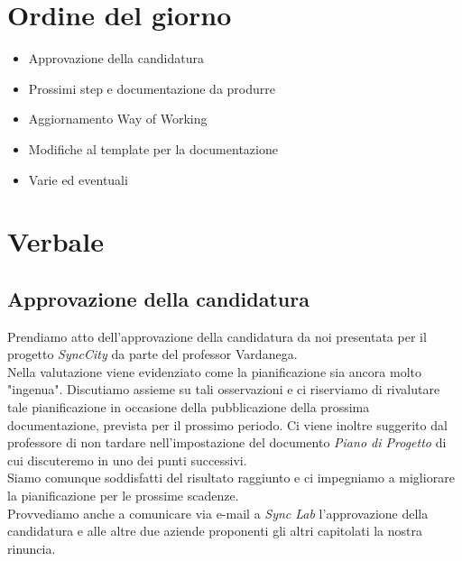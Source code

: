 \documentclass[italian,12pt]{article} %
\begin{document}
\section{Ordine del giorno}
\begin{itemize}
	\itemsep0em
	\item \textbf{}Approvazione della candidatura
	\item \textbf{}Prossimi step e documentazione da produrre
	\item \textbf{}Aggiornamento Way of Working
	\item \textbf{}Modifiche al template per la documentazione
	\item \textbf{}Varie ed eventuali
\end{itemize}

\newpage

\section{Verbale}

\subsection{Approvazione della candidatura}
Prendiamo atto dell'approvazione della candidatura da noi presentata per il progetto 
\textit{SyncCity} da parte del professor Vardanega. \\
Nella valutazione viene evidenziato come la pianificazione sia ancora molto "ingenua". 
Discutiamo assieme su tali osservazioni e ci riserviamo di rivalutare tale 
pianificazione in occasione della pubblicazione della prossima documentazione, 
prevista per il prossimo periodo. Ci viene inoltre suggerito dal professore di 
non tardare nell'impostazione del documento \textit{Piano di Progetto} di cui 
discuteremo in uno dei punti successivi. \\
Siamo comunque soddisfatti del risultato raggiunto e ci impegniamo a migliorare la 
pianificazione per le prossime scadenze. \\
Provvediamo anche a comunicare via e-mail a \textit{Sync Lab} l'approvazione della 
candidatura e alle altre due aziende proponenti gli altri capitolati la nostra 
rinuncia.
\end{document}
